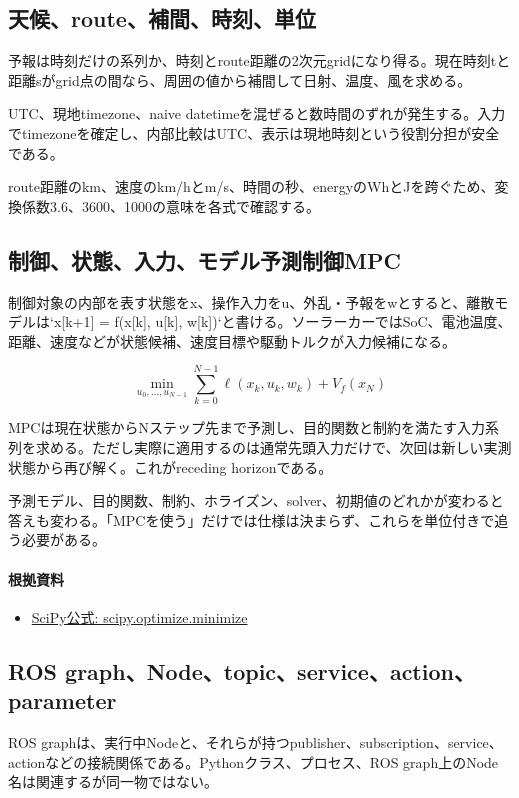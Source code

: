 \documentclass[a4paper,11pt]{article}
\begin{document}
\subsection{天候、route、補間、時刻、単位}
予報は時刻だけの系列か、時刻とroute距離の2次元gridになり得る。現在時刻tと距離sがgrid点の間なら、周囲の値から補間して日射、温度、風を求める。


UTC、現地timezone、naive datetimeを混ぜると数時間のずれが発生する。入力でtimezoneを確定し、内部比較はUTC、表示は現地時刻という役割分担が安全である。


route距離のkm、速度のkm/hとm/s、時間の秒、energyのWhとJを跨ぐため、変換係数3.6、3600、1000の意味を各式で確認する。



\subsection{制御、状態、入力、モデル予測制御MPC}
制御対象の内部を表す状態をx、操作入力をu、外乱・予報をwとすると、離散モデルは`x[k+1] = f(x[k], u[k], w[k])`と書ける。ソーラーカーではSoC、電池温度、距離、速度などが状態候補、速度目標や駆動トルクが入力候補になる。


\[
\min_{u_0,\ldots,u_{N-1}} \sum_{k=0}^{N-1}\ell(x_k,u_k,w_k)+V_f(x_N)
\]

MPCは現在状態からNステップ先まで予測し、目的関数と制約を満たす入力系列を求める。ただし実際に適用するのは通常先頭入力だけで、次回は新しい実測状態から再び解く。これがreceding horizonである。


予測モデル、目的関数、制約、ホライズン、solver、初期値のどれかが変わると答えも変わる。「MPCを使う」だけでは仕様は決まらず、これらを単位付きで追う必要がある。

\paragraph{根拠資料}
\begin{itemize}[leftmargin=1.6em]
\item \href{https://docs.scipy.org/doc/scipy/reference/generated/scipy.optimize.minimize.html}{SciPy公式: scipy.optimize.minimize}
\end{itemize}

\subsection{ROS graph、Node、topic、service、action、parameter}
ROS graphは、実行中Nodeと、それらが持つpublisher、subscription、service、actionなどの接続関係である。Pythonクラス、プロセス、ROS graph上のNode名は関連するが同一物ではない。
\end{document}
